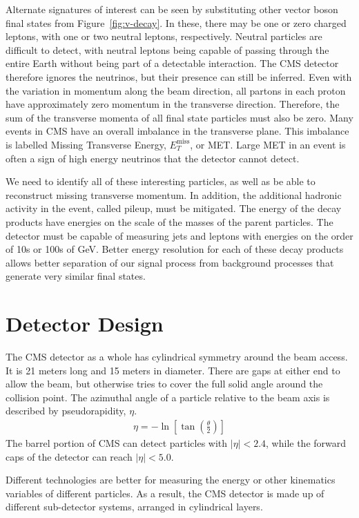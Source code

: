 Alternate signatures of interest can be seen by substituting other vector boson final states
from Figure~\ref{fig:v-decay}.
In these, there may be one or zero charged leptons,
with one or two neutral leptons, respectively.
Neutral particles are difficult to detect,
with neutral leptons being capable of passing through the entire Earth without
being part of a detectable interaction.
The CMS detector therefore ignores the neutrinos,
but their presence can still be inferred.
Even with the variation in momentum along the beam direction,
all partons in each proton have approximately zero momentum in the transverse direction.
Therefore, the sum of the transverse momenta of all final state particles must also be zero.
Many events in CMS have an overall imbalance in the transverse plane.
This imbalance is labelled Missing Transverse Energy, $E^\textrm{miss}_T$, or MET.
Large MET in an event is often a sign of high energy neutrinos that the detector cannot detect.

We need to identify all of these interesting particles,
as well as be able to reconstruct missing transverse momentum.
In addition, the additional hadronic activity in the event, called pileup, must be mitigated.
The energy of the decay products have energies on the scale of the masses of the parent particles.
The detector must be capable of measuring jets and leptons with energies on the
order of 10s or 100s of GeV.
Better energy resolution for each of these decay products allows better separation
of our signal process from background processes that generate very similar final states.

\section{Detector Design}

The CMS detector as a whole has cylindrical symmetry around the beam access.
It is 21 meters long and 15 meters in diameter.
There are gaps at either end to allow the beam,
but otherwise tries to cover the full solid angle around the collision point.
The azimuthal angle of a particle relative to the beam axis is described
by pseudorapidity, $\eta$.
\begin{gather}
  \eta = -\ln \left[\tan \left( \frac \theta 2 \right) \right]
\end{gather}
The barrel portion of CMS can detect particles with $|\eta| < 2.4$,
while the forward caps of the detector can reach $|\eta| < 5.0$.

Different technologies are better for measuring the energy
or other kinematics variables of different particles.
As a result, the CMS detector is made up of different sub-detector systems,
arranged in cylindrical layers.

